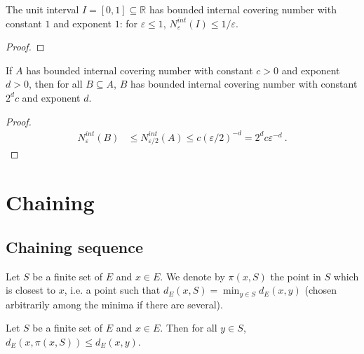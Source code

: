 \begin{lemma}\label{lem:hasBoundedInternalCoveringNumber_unitInterval}
  \leanok
The unit interval $I = [0, 1] \subseteq \mathbb{R}$ has bounded internal covering number with constant $1$ and exponent $1$: for $\varepsilon \le 1$, $N^{int}_\varepsilon(I) \le 1/\varepsilon$.
\end{lemma}

\begin{proof}\leanok

\end{proof}


\begin{lemma}\label{lem:hasBoundedInternalCoveringNumber_subset}
  \leanok
If $A$ has bounded internal covering number with constant $c>0$ and exponent $d>0$, then for all $B \subseteq A$, $B$ has bounded internal covering number with constant $2^d c$ and exponent $d$.
\end{lemma}

\begin{proof}\leanok
\begin{align*}
  N^{int}_\varepsilon(B)
  &\le N^{int}_{\varepsilon/2}(A)
  \le c (\varepsilon/2)^{-d}
  = 2^d c \varepsilon^{-d}
  \: .
\end{align*}
\end{proof}


\section{Chaining}

\subsection{Chaining sequence}


\begin{definition}\label{def:nearestPt}
  \leanok
Let $S$ be a finite set of $E$ and $x \in E$.
We denote by $\pi(x, S)$ the point in $S$ which is closest to $x$, i.e. a point such that $d_E(x, S) = \min_{y \in S} d_E(x, y)$ (chosen arbitrarily among the minima if there are several).
\end{definition}


\begin{lemma}\label{lem:dist_nearestPt_le}
  \leanok
Let $S$ be a finite set of $E$ and $x \in E$.
Then for all $y \in S$, $d_E(x, \pi(x, S)) \le d_E(x, y)$.
\end{lemma}


